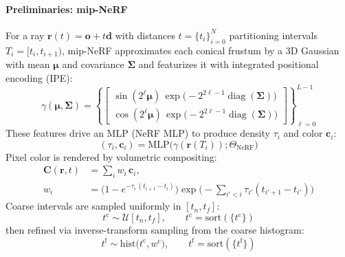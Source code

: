 \begin{enrichment}
\begin{enrichment}
        \paragraph{Preliminaries: mip-NeRF}
        \label{par:chapter23_mipnerf360_prelims}
        For a ray $\mathbf{r}(t)=\mathbf{o}+t\mathbf{d}$ with distances $t=\{t_i\}_{i=0}^{N}$ partitioning intervals $T_i=[t_i,t_{i+1})$, mip-NeRF approximates each conical frustum by a 3D Gaussian with mean $\boldsymbol\mu$ and covariance $\boldsymbol\Sigma$ and featurizes it with integrated positional encoding (IPE):
        \begin{equation}
            \gamma(\boldsymbol\mu,\boldsymbol\Sigma)=\left\{\!
            \begin{bmatrix}
                \sin(2^{\ell}\boldsymbol\mu)\,\exp\!\big(-2^{2\ell-1}\operatorname{diag}(\boldsymbol\Sigma)\big)\\
                \cos(2^{\ell}\boldsymbol\mu)\,\exp\!\big(-2^{2\ell-1}\operatorname{diag}(\boldsymbol\Sigma)\big)
            \end{bmatrix}
            \right\}_{\ell=0}^{L-1}
            \label{eq:mipnerf_ipe}
        \end{equation}
        These features drive an MLP (NeRF MLP) to produce density $\tau_i$ and color $\mathbf{c}_i$:
        \begin{equation}
            (\tau_i,\mathbf{c}_i)=\mathrm{MLP}\!\big(\gamma(\mathbf{r}(T_i));\Theta_{\text{NeRF}}\big)
            \label{eq:mipnerf_mlp}
        \end{equation}
        Pixel color is rendered by volumetric compositing:
        \begin{align}
            \mathbf{C}(\mathbf{r},t) &= \sum_i w_i\,\mathbf{c}_i,
            \label{eq:mipnerf_color}\\
            w_i &= \big(1-e^{-\tau_i\,(t_{i+1}-t_i)}\big)\exp\!\Big(-\sum_{i'<i}\tau_{i'}(t_{i'+1}-t_{i'})\Big)
            \label{eq:mipnerf_weights}
        \end{align}
        Coarse intervals are sampled uniformly in $[t_n,t_f]$:
        \begin{equation}
            t^{\mathrm{c}}\sim \mathcal{U}[t_n,t_f],\qquad t^{\mathrm{c}}=\mathrm{sort}(\{t^{\mathrm{c}}\})
            \label{eq:mipnerf_tc}
        \end{equation}
        then refined via inverse-transform sampling from the coarse histogram:
        \begin{equation}
            t^{\mathrm{f}}\sim \mathrm{hist}\!\big(t^{\mathrm{c}},w^{\mathrm{c}}\big),\qquad t^{\mathrm{f}}=\mathrm{sort}(\{t^{\mathrm{f}}\})

\end{equation}
\end{enrichment}
\end{enrichment}
